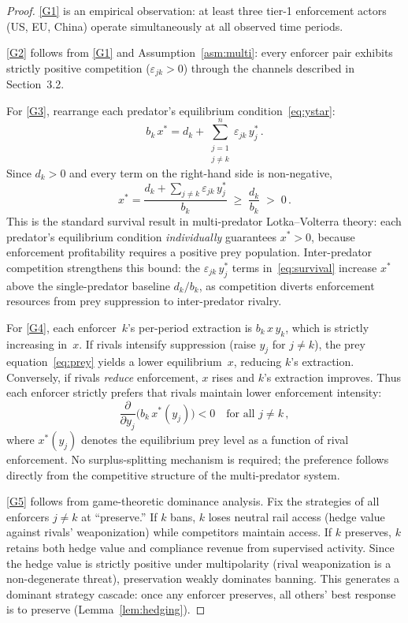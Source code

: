 \documentclass[12pt]{article}
\theoremstyle{definition}
\theoremstyle{remark}
\begin{document}
\begin{proof}
\ref{G1} is an empirical observation: at least three tier-1 enforcement
actors (US, EU, China) operate simultaneously at all observed time
periods.

\ref{G2} follows from \ref{G1} and Assumption~\ref{asm:multi}: every
enforcer pair exhibits strictly positive competition
($\varepsilon_{jk} > 0$) through the channels described in
Section~3.2.

For \ref{G3}, rearrange each predator's equilibrium
condition~\eqref{eq:ystar}:
\begin{equation}\label{eq:survival}
  b_k \, x^{*} = d_k + \sum_{\substack{j=1 \\ j \neq k}}^{n}
    \varepsilon_{jk} \, y_j^{*} \,.
\end{equation}
Since $d_k > 0$ and every term on the right-hand side is non-negative,
\[
  x^{*} = \frac{d_k + \sum_{j \neq k}
    \varepsilon_{jk} \, y_j^{*}}{b_k}
    \;\geq\; \frac{d_k}{b_k} \;>\; 0 \,.
\]
This is the standard survival result in multi-predator
Lotka--Volterra theory: each predator's equilibrium condition
\emph{individually} guarantees $x^{*} > 0$, because enforcement
profitability requires a positive prey population.  Inter-predator
competition strengthens this bound: the $\varepsilon_{jk} \, y_j^{*}$
terms in~\eqref{eq:survival} increase $x^{*}$ above the
single-predator baseline $d_k/b_k$, as competition diverts enforcement
resources from prey suppression to inter-predator rivalry.

For \ref{G4}, each enforcer~$k$'s per-period extraction is
$b_k \, x \, y_k$, which is strictly increasing in~$x$.  If rivals
intensify suppression (raise $y_j$ for $j \neq k$), the prey
equation~\eqref{eq:prey} yields a lower equilibrium~$x$, reducing
$k$'s extraction.  Conversely, if rivals \emph{reduce} enforcement,
$x$ rises and $k$'s extraction improves.  Thus each enforcer strictly
prefers that rivals maintain lower enforcement intensity:
\[
  \frac{\partial}{\partial y_j}\!\bigl(b_k \, x^{*}(y_j)\bigr)
  < 0 \quad \text{for all } j \neq k \,,
\]
where $x^{*}(y_j)$ denotes the equilibrium prey level as a function of
rival enforcement.  No surplus-splitting mechanism is required; the
preference follows directly from the competitive structure of the
multi-predator system.

\ref{G5} follows from game-theoretic dominance analysis. Fix the
strategies of all enforcers $j \neq k$ at ``preserve.'' If $k$ bans,
$k$ loses neutral rail access (hedge value against rivals'
weaponization) while competitors maintain access. If $k$ preserves, $k$
retains both hedge value and compliance revenue from supervised activity.
Since the hedge value is strictly positive under multipolarity (rival
weaponization is a non-degenerate threat), preservation weakly dominates
banning. This generates a dominant strategy cascade: once any enforcer
preserves, all others' best response is to preserve
(Lemma~\ref{lem:hedging}).


\end{proof}
\end{document}
